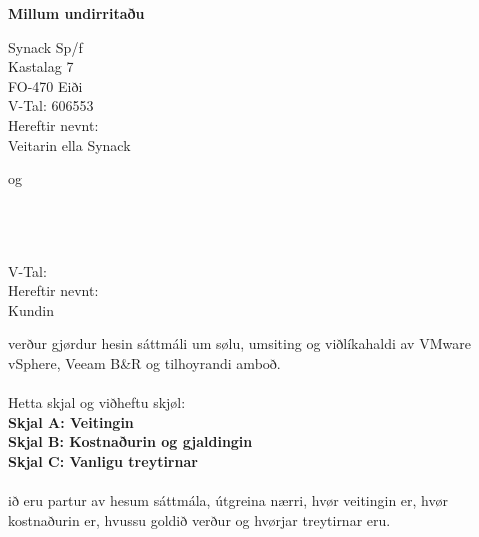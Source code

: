\begin{titlepage}
	\vspace*{-20mm} \large
\author{Heðin Ejdesgaard Møller}
\thispagestyle{SYNACKSALEFOOTER}
\vspace{25mm}
\begin{center}
	\textbf{Millum undirritaðu}
\end{center}
\begin{minipage}{0.32\textwidth}
	\begin{center}
	  	Synack Sp/f		\\
	  	Kastalag 7		\\
	  	FO-470 Eiði		\\
	  	V-Tal: 606553	\\ \vspace{3mm}
	  	Hereftir nevnt:	\\ Veitarin ella Synack
	\end{center}
\end{minipage}
\begin{minipage}{0.32\textwidth}
	\begin{center}
		og
	\end{center}
\end{minipage}
\begin{minipage}{0.32\textwidth}
	\begin{center}
	   	\Kunden\KundenPf			\\
	   	\KundenAddr		\\
	   	\KundenPost		\\
	   	V-Tal: \KundenVTAL		\\ \vspace{3mm}
	   	Hereftir nevnt:\\ Kundin
	\end{center}
\end{minipage}

\vspace{25mm} 
\noindent
verður gjørdur hesin sáttmáli um sølu, umsiting og viðlíkahaldi av VMware vSphere, Veeam B\&R og tilhoyrandi amboð. \\ \\
Hetta skjal og viðheftu skjøl: \\
\textbf{Skjal A: Veitingin} \\
\textbf{Skjal B: Kostnaðurin og gjaldingin} \\
\textbf{Skjal C: Vanligu treytirnar} \\ \\
ið eru partur av hesum sáttmála, útgreina nærri, hvør veitingin er, hvør kostnaðurin er, hvussu  goldið verður og hvørjar treytirnar eru. \\ \vspace*{15mm}


\end{titlepage}
